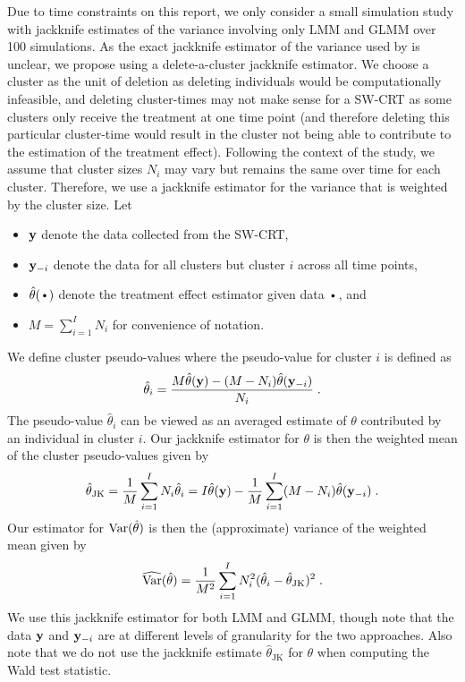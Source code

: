 \documentclass[10pt]{article}
\begin{document}
Due to time constraints on this report, we only consider a small simulation study with jackknife estimates of the variance involving only LMM and GLMM over 100 simulations. As the exact jackknife estimator of the variance used by \citeauthor{Hussey:2007} is unclear, we propose using a delete-a-cluster jackknife estimator. We choose a cluster as the unit of deletion as deleting individuals would be computationally infeasible, and deleting cluster-times may not make sense for a SW-CRT as some clusters only receive the treatment at one time point (and therefore deleting this particular cluster-time would result in the cluster not being able to contribute to the estimation of the treatment effect). Following the context of the study, we assume that cluster sizes $N_i$ may vary but remains the same over time for each cluster. Therefore, we use a jackknife estimator for the variance that is weighted by the cluster size. Let
\begin{itemize}

\item
$\mathbf{y}$ denote the data collected from the SW-CRT,

\item
$\mathbf{y}_{-i}$ denote the data for all clusters but cluster $i$ across all time points,

\item
$\hat{\theta}(\argdot)$ denote the treatment effect estimator given data $\argdot$, and

\item
$M=\sum_{i=1}^IN_i$ for convenience of notation.

\end{itemize}
We define cluster pseudo-values where the pseudo-value for cluster $i$ is defined as
\[
\hat{\theta}_i = \frac{M\hat{\theta}(\mathbf{y}) - (M-N_i)\hat{\theta}(\mathbf{y}_{-i})}{N_i} \;.
\]
The pseudo-value $\hat{\theta}_i$ can be viewed as an averaged estimate of $\theta$ contributed by an individual in cluster $i$. Our jackknife estimator for $\theta$ is then the weighted mean of the cluster pseudo-values given by
\[
\hat{\theta}_{\text{JK}} = \frac{1}{M}\sum_{i=1}^I N_i\hat{\theta}_i = I\hat{\theta}(\mathbf{y}) - \frac{1}{M}\sum_{i=1}^I(M-N_i)\hat{\theta}(\mathbf{y}_{-i}) \;.
\]
Our estimator for $\mathrm{Var}(\hat{\theta})$ is then the (approximate) variance of the weighted mean given by
\[
\widehat{\mathrm{Var}}(\hat{\theta}) = \frac{1}{M^2}\sum_{i=1}^IN_i^2(\hat{\theta}_i-\hat{\theta}_{\text{JK}})^2 \;.
\]
We use this jackknife estimator for both LMM and GLMM, though note that the data $\mathbf{y}$ and $\mathbf{y}_{-i}$ are at different levels of granularity for the two approaches. Also note that we do not use the jackknife estimate $\hat{\theta}_{\text{JK}}$ for $\theta$ when computing the Wald test statistic.
\end{document}
